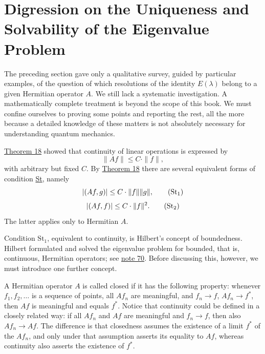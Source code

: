 \documentclass[fontsize=13pt,twoside,openany,headings=normal,parskip=false,bookmarkpackage=false,DIV=calc]{scrbook}
\begin{document}
\section{Digression on the Uniqueness and Solvability of the Eigenvalue Problem}\label{sec:II.9}
The preceding section gave only a qualitative survey, guided by particular examples, of the question of which resolutions of the identity $E(\lambda)$ belong to a given Hermitian operator $A$. We still lack a systematic investigation. A mathematically complete treatment is beyond the scope of this book. We must confine ourselves to proving some points and reporting the rest, all the more because a detailed knowledge of these matters is not absolutely necessary for understanding quantum mechanics.

\hyperref[thm:II.18]{Theorem 18} showed that continuity of linear operations is expressed by
\begin{equation}
\|Af\|\leq C\cdot\|f\|,\tag{St}\label{eq:II.9.St}
\end{equation}
with arbitrary but fixed $C$. By \hyperref[thm:II.18]{Theorem 18} there are several equivalent forms of condition \hyperref[eq:II.9.St]{St}, namely
\begin{equation}
|(Af,g)|\leq C\cdot\|f\|\|g\|,\tag{$\mathrm{St}_1$}\label{eq:II.9.St1}
\end{equation}
\begin{equation}
|(Af,f)|\leq C\cdot\|f\|^2.\tag{$\mathrm{St}_2$}\label{eq:II.9.St2}
\end{equation}
The latter applies only to Hermitian $A$.

Condition $\hyperref[eq:II.9.St1]{\mathrm{St}_1}$, equivalent to continuity, is Hilbert's concept of boundedness. Hilbert formulated and solved the eigenvalue problem for bounded, that is, continuous, Hermitian operators; see \hyperlink{note-70}{note 70}. Before discussing this, however, we must introduce one further concept.

A Hermitian operator $A$ is called closed if it has the following property: whenever $f_1,f_2,\ldots$ is a sequence of points, all $Af_n$ are meaningful, and $f_n\to f$, $Af_n\to f^*$, then $Af$ is meaningful and equals $f^*$. Notice that continuity could be defined in a closely related way: if all $Af_n$ and $Af$ are meaningful and $f_n\to f$, then also $Af_n\to Af$. The difference is that closedness assumes the existence of a limit $f^*$ of the $Af_n$, and only under that assumption asserts its equality to $Af$, whereas continuity also asserts the existence of $f^*$.
\end{document}
